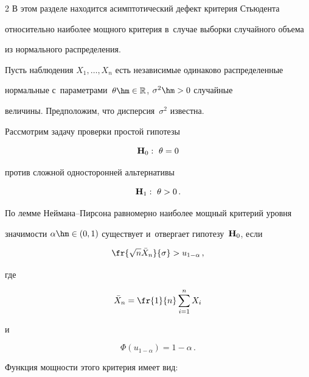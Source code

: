\begin{multicols}{2}
В этом разделе находится асимптотический дефект критерия Стьюдента 


относительно наиболее мощного критерия в~случае выборки случайного объема 


из нормального распределения.





Пусть наблюдения $X_1,\ldots,X_n$ есть независимые одинаково распределенные 


нормальные с~па\-ра\-мет\-ра\-ми~$\theta\hm \in \mathbb{R}$, $\sigma^2\hm > 0$ случайные 


величины. Предположим, что дисперсия~$\sigma^2$ известна.


Рассмотрим задачу проверки простой гипотезы


\begin{equation*}


{\bf H}_0:\ \theta = 0




\end{equation*}


против сложной односторонней альтернативы


\begin{equation*}


{\bf H}_1:\ \theta > 0\,.




\end{equation*}


По лемме Неймана--Пир\-со\-на равномерно наиболее мощный критерий уровня 


значимости $\alpha\hm \in (0,1)$ существует и~отвергает гипотезу~${\bf H}_0$, если


\begin{equation}


\fr{\sqrt n \bar X_n}{\sigma} > u_{1-\alpha}\,,\label{e4.3}


\end{equation}


где


$$


\bar X_n = \fr{1}{n} \sum\limits_{i=1}^n X_i


$$


и


$$


\Phi\left(u_{1-\alpha}\right) = 1 - \alpha\,.


$$


Функция мощности этого критерия имеет вид:



\end{multicols}
